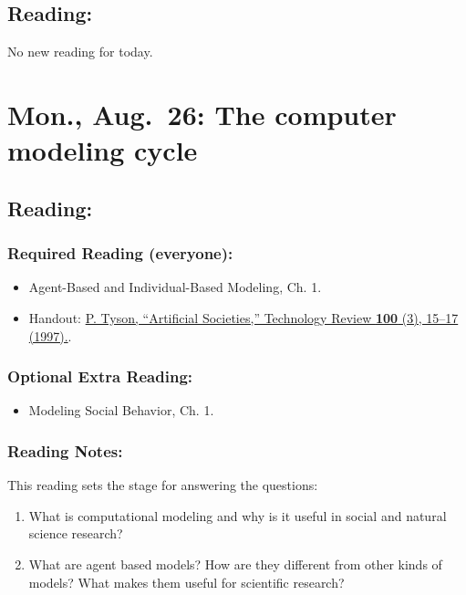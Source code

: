 \documentclass[
]{article}
\providecommand{\tightlist}{%
  \setlength{\itemsep}{0pt}\setlength{\parskip}{0pt}}
\begin{document}
\subsection{Reading:}\label{reading}

No new reading for today.

\section{Mon., Aug.~26: The computer modeling
cycle}\label{mon.-aug.-26-the-computer-modeling-cycle}

\subsection{Reading:}\label{reading-1}

\subsubsection{Required Reading
(everyone):}\label{required-reading-everyone}

\begin{itemize}
\tightlist
\item
  Agent-Based and Individual-Based Modeling, Ch. 1.
\item
  Handout: \href{/files/reading/Tyson_Artificial_Societies_1997.pdf}{P.
  Tyson, ``Artificial Societies,'' Technology Review \textbf{100} (3),
  15--17 (1997).}.
\end{itemize}

\subsubsection{Optional Extra Reading:}\label{optional-extra-reading}

\begin{itemize}
\tightlist
\item
  Modeling Social Behavior, Ch. 1.
\end{itemize}

\subsubsection{Reading Notes:}\label{reading-notes}

This reading sets the stage for answering the questions:

\begin{enumerate}
\def\labelenumi{\arabic{enumi}.}
\tightlist
\item
  What is computational modeling and why is it useful in social and
  natural science research?
\item
  What are agent based models? How are they different from other kinds
  of models? What makes them useful for scientific research?
\end{enumerate}
\end{document}
